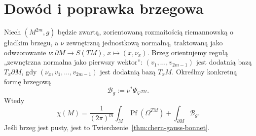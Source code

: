 \section{Dowód i poprawka brzegowa}
\label{sec:CGB-proof-26}

\begin{twierdzenie}
\label{thm:CGB-boundary-26}
Niech $(M^{2m},g)$ będzie zwartą,
zorientowaną rozmaitością
riemannowską o gładkim brzegu,
a $\nu$ zewnętrzną jednostkową
normalną, traktowaną jako odwzorowanie
$\nu:\partial M\to S(TM)$, $x\mapsto(x,\nu_x)$.
Brzeg orientujemy regułą „zewnętrzna normalna jako pierwszy
wektor”: $(v_1,\ldots,v_{2m-1})$ jest dodatnią bazą
$T_x\partial M$, gdy $(\nu_x,v_1,\ldots,v_{2m-1})$
jest dodatnią bazą $T_xM$.
Określmy konkretną
formę brzegową
\begin{equation}\label{eq:CGB-boundary-form-26}
 \mathcal B_g:=\nu^*
       \Psi_{\nabla^{TM}}.
\end{equation}
Wtedy
\begin{equation}\label{eq:CGB-boundary-26}
 \boxed{\displaystyle
 \chi(M)=\frac{1}{(2\pi)^m}
     \int_M\operatorname{Pf}(\Omega^{TM})
       +\int_{\partial M}\mathcal B_g.}
\end{equation}
Jeśli brzeg jest pusty, jest to
Twierdzenie~\ref{thm:chern-gauss-bonnet}.
\end{twierdzenie}
